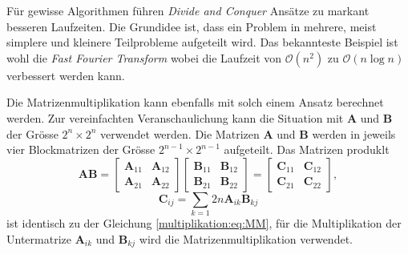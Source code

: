 F\"ur gewisse Algorithmen f\"uhren \textit{Divide and Conquer}  Ans\"atze \cite{multiplikation:DAC} zu markant besseren Laufzeiten.
Die Grundidee ist, dass ein Problem in mehrere, meist simplere und kleinere Teilprobleme aufgeteilt wird.
Das bekannteste Beispiel ist wohl die \textit{Fast Fourier Transform} wobei die Laufzeit von $\mathcal{O}\left(n^2\right)$ zu $\mathcal{O}(n \log n)$ verbessert werden kann.

Die Matrizenmultiplikation kann ebenfalls mit solch einem Ansatz berechnet werden.
Zur vereinfachten Veranschaulichung kann die Situation mit $\mathbf{A}$ und $\mathbf{B}$ der Gr\"osse $2^n \times 2^n$ verwendet werden.
Die Matrizen $\mathbf{A}$ und $\mathbf{B}$ werden in jeweils vier Blockmatrizen der Gr\"osse $2^{n-1} \times 2^{n-1}$ aufgeteilt.
Das Matrizen produklt
\begin{equation}
\mathbf{A}\mathbf{B}=
\begin{bmatrix}
\mathbf{A}_{11} & \mathbf{A}_{12}\\
\mathbf{A}_{21} & \mathbf{A}_{22}
\end{bmatrix}
\begin{bmatrix}
\mathbf{B}_{11} & \mathbf{B}_{12}\\
\mathbf{B}_{21} & \mathbf{B}_{22}
\end{bmatrix}
=
\begin{bmatrix}
\mathbf{C}_{11} & \mathbf{C}_{12}\\
\mathbf{C}_{21} & \mathbf{C}_{22}
\end{bmatrix},
\end{equation}
\begin{equation}
\mathbf{C}_{ij} = \sum_{k=1}2n \mathbf{A}_{ik} \mathbf{B}_{kj}
\label{multiplikation:eq:MM_block}
\end{equation}
ist identisch zu der Gleichung \eqref{multiplikation:eq:MM}, f\"ur die Multiplikation der Untermatrize $\mathbf{A}_{ik}$ und $\mathbf{B}_{kj}$ wird die Matrizenmultiplikation verwendet.

